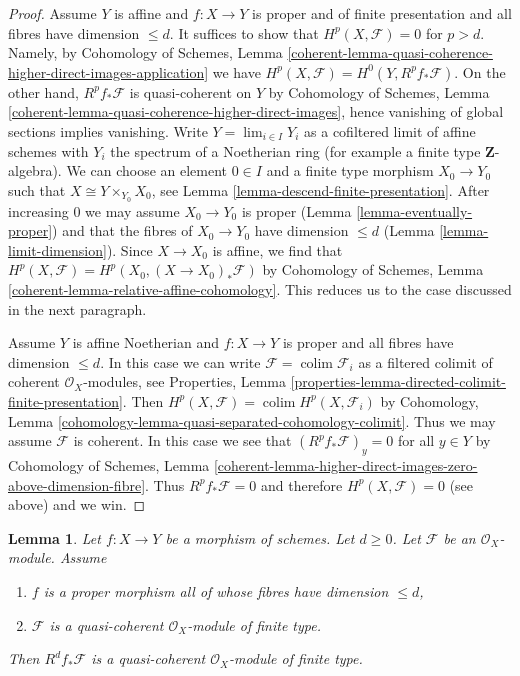\documentclass{stacks-project}
\theoremstyle{plain}
\newtheorem{lemma}[subsection]{Lemma}
\theoremstyle{definition}
\theoremstyle{remark}
\numberwithin{equation}{subsection}
\def\lim{\mathop{\mathrm{lim}}\nolimits}
\def\colim{\mathop{\mathrm{colim}}\nolimits}
\begin{document}
\begin{proof}
\medskip\noindent
Assume $Y$ is affine and $f : X \to Y$ is proper and of finite presentation
and all fibres have dimension $\leq d$. It suffices to show that
$H^p(X, \mathcal{F}) = 0$ for $p > d$. Namely, by
Cohomology of Schemes, Lemma
\ref{coherent-lemma-quasi-coherence-higher-direct-images-application}
we have $H^p(X, \mathcal{F}) = H^0(Y, R^pf_*\mathcal{F})$.
On the other hand, $R^pf_*\mathcal{F}$ is quasi-coherent on $Y$
by Cohomology of Schemes, Lemma
\ref{coherent-lemma-quasi-coherence-higher-direct-images},
hence vanishing of global sections implies vanishing.
Write $Y = \lim_{i \in I} Y_i$ as a cofiltered limit of affine schemes
with $Y_i$ the spectrum of a Noetherian ring
(for example a finite type $\mathbf{Z}$-algebra).
We can choose an element $0 \in I$ and a finite type morphism
$X_0 \to Y_0$ such that $X \cong Y \times_{Y_0} X_0$, see
Lemma \ref{lemma-descend-finite-presentation}.
After increasing $0$ we may assume $X_0 \to Y_0$ is proper
(Lemma \ref{lemma-eventually-proper})
and that the fibres of $X_0 \to Y_0$ have dimension $\leq d$
(Lemma \ref{lemma-limit-dimension}).
Since $X \to X_0$ is affine, we find that
$H^p(X, \mathcal{F}) = H^p(X_0, (X \to X_0)_*\mathcal{F})$ by
Cohomology of Schemes, Lemma \ref{coherent-lemma-relative-affine-cohomology}.
This reduces us to the case discussed in the next paragraph.

\medskip\noindent
Assume $Y$ is affine Noetherian and $f : X \to Y$ is proper
and all fibres have dimension $\leq d$.
In this case we can write $\mathcal{F} = \colim \mathcal{F}_i$
as a filtered colimit of coherent $\mathcal{O}_X$-modules, see
Properties, Lemma
\ref{properties-lemma-directed-colimit-finite-presentation}.
Then $H^p(X, \mathcal{F}) = \colim H^p(X, \mathcal{F}_i)$ by
Cohomology, Lemma \ref{cohomology-lemma-quasi-separated-cohomology-colimit}.
Thus we may assume $\mathcal{F}$ is coherent.
In this case we see that $(R^pf_*\mathcal{F})_y = 0$ for
all $y \in Y$ by Cohomology of Schemes, Lemma
\ref{coherent-lemma-higher-direct-images-zero-above-dimension-fibre}.
Thus $R^pf_*\mathcal{F} = 0$ and therefore
$H^p(X, \mathcal{F}) = 0$ (see above) and we win.
\end{proof}

\begin{lemma}
\label{lemma-proper-top-cohomology-finite-type}
Let $f : X \to Y$ be a morphism of schemes. Let $d \geq 0$. Let $\mathcal{F}$
be an $\mathcal{O}_X$-module. Assume
\begin{enumerate}
\item $f$ is a proper morphism all of whose fibres have dimension $\leq d$,
\item $\mathcal{F}$ is a quasi-coherent $\mathcal{O}_X$-module of finite type.
\end{enumerate}
Then $R^df_*\mathcal{F}$ is a quasi-coherent $\mathcal{O}_X$-module
of finite type.
\end{lemma}
\end{document}
